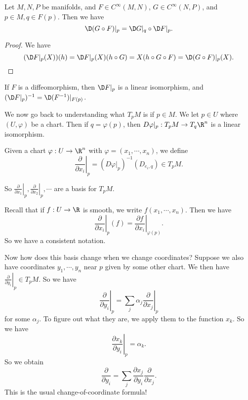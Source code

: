 \documentclass[a4paper]{article}
\begin{document}
\begin{prop}
  Let $M, N, P$ be manifolds, and $F \in C^\infty(M, N)$, $G \in C^\infty(N, P)$, and $p \in M, q \in F(p)$. Then we have
  \[
    \D(G \circ F)|_p = \D G|_q \circ \D F|_p.
  \]
\end{prop}

\begin{proof}
  We have
  \[
    (\D F|_p (X))(h) = \D F|_p(X) (h \circ G) = X(h \circ G \circ F) = \D (G \circ F)|_p (X).
  \]
\end{proof}

\begin{cor}
  If $F$ is a diffeomorphism, then $\D F|_p$ is a linear isomorphism, and $(\D F|_p)^{-1} = \D (F^{-1})|_{F(p)}$.
\end{cor}

We now go back to understanding what $T_pM$ is if $p \in M$. We let $p \in U$ where $(U, \varphi)$ be a chart. Then if $q = \varphi(p)$, then $D\varphi|_p: T_p M \to T_q \R^n$ is a linear isomorphism.

\begin{defi}
  Given a chart $\varphi: U \to \R^n$ with $\varphi = (x_1, \cdots, x_n)$, we define
  \[
    \left.\frac{\partial}{\partial x_i}\right|_p = (D \varphi|_p)^{-1} (D_{e_i, q}) \in T_p M.
  \]
\end{defi}
So $\left.\frac{\partial}{\partial x_1}\right|_p, \left.\frac{\partial}{\partial x_2}\right|_p, \cdots$ are a basis for $T_p M$.

Recall that if $f: U \to \R$ is smooth, we write $f(x_1, \cdots, x_n)$. Then we have
\[
  \left.\frac{\partial}{\partial x_i}\right|_p (f) = \left.\frac{\partial f}{\partial x_i}\right|_{\varphi(p)}.
\]
So we have a consistent notation.

Now how does this basis change when we change coordinates? Suppose we also have coordinates $y_1, \cdots, y_n$ near $p$ given by some other chart. We then have $\left.\frac{\partial}{\partial y_i}\right|_p \in T_p M$. So we have
\[
  \left.\frac{\partial}{\partial y_i}\right|_p = \sum_j \alpha_j \left.\frac{\partial}{\partial x_j}\right|_p
\]
for some $\alpha_j$. To figure out what they are, we apply them to the function $x_k$. So we have
\[
  \left.\frac{\partial x_k}{\partial y_i}\right|_p = \alpha_k.
\]
So we obtain
\[
  \frac{\partial}{\partial y_i} = \sum_j \frac{\partial x_j}{\partial y_i} \frac{\partial}{\partial x_j}.
\]
This is the usual change-of-coordinate formula!
\end{document}
